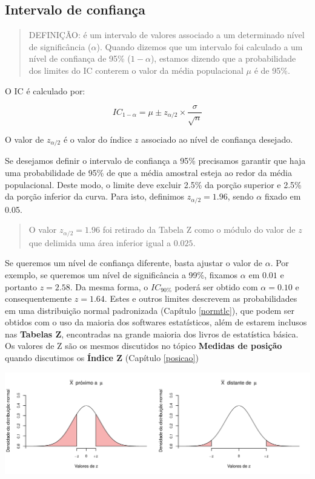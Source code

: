 \documentclass[
]{book}
\begin{document}
\hypertarget{intervalo-de-confianuxe7a}{%
\subsection{Intervalo de confiança}\label{intervalo-de-confianuxe7a}}

\begin{quote}
DEFINIÇÃO: é um intervalo de valores associado a um determinado nível de significância (\(\alpha\)). Quando dizemos que um intervalo foi calculado a um nível de confiança de 95\% (\(1 - \alpha\)), estamos dizendo que a probabilidade dos limites do IC conterem o valor da média populacional \(\mu\) é de 95\%.
\end{quote}

O IC é calculado por:

\[IC_{1-\alpha} = \mu \pm z_{\alpha/2} \times \frac{\sigma}{\sqrt{n}}\]

O valor de \(z_{\alpha/2}\) é o valor do índice \(z\) associado ao nível de confiança desejado.

Se desejamos definir o intervalo de confiança a 95\% precisamos garantir que haja uma probabilidade de 95\% de que a média amostral esteja ao redor da média populacional. Deste modo, o limite deve excluir 2.5\% da porção superior e 2.5\% da porção inferior da curva. Para isto, definimos \(z_{\alpha/2} = 1.96\), sendo \(\alpha\) fixado em 0.05.

\begin{quote}
O valor \(z_{\alpha/2} = 1.96\) foi retirado da Tabela Z como o módulo do valor de \(z\) que delimida uma área inferior igual a \(0.025\).
\end{quote}

Se queremos um nível de confiança diferente, basta ajustar o valor de \(\alpha\). Por exemplo, se queremos um nível de significância a 99\%, fixamos \(\alpha\) em \(0.01\) e portanto \(z = 2.58\). Da mesma forma, o \(IC_{90\%}\) poderá ser obtido com \(\alpha = 0.10\) e consequentemente \(z = 1.64\). Estes e outros limites descrevem as probabilidades em uma distribuição normal padronizada (Capítulo \ref{normtlc}), que podem ser obtidos com o uso da maioria dos softwares estatísticos, além de estarem inclusos nas \textbf{Tabelas Z}, encontradas na grande maioria dos livros de estatística básica. Os valores de Z são os mesmos discutidos no tópico \textbf{Medidas de posição} quando discutimos os \textbf{Índice Z} (Capítulo \ref{posicao})

\begin{center}\includegraphics{probest-cambientais_files/figure-latex/unnamed-chunk-119-1} \end{center}
\end{document}
